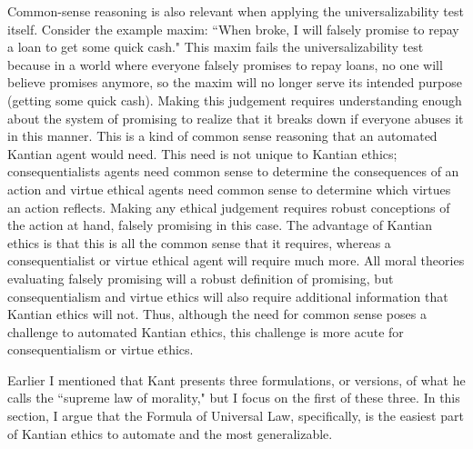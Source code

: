 \begin{isabellebody}
\begin{isamarkuptext}
Common-sense reasoning is also relevant when applying the universalizability test itself. Consider the example
maxim: ``When broke, I will falsely promise to repay a loan
to get some quick cash." This maxim fails the universalizability test because in a world where everyone
falsely promises to repay loans, no one will believe promises anymore, so the maxim will no longer serve
its intended purpose (getting some quick cash). Making this judgement requires understanding enough about
the system of promising to realize that it breaks down if everyone abuses it in this manner. This is a
kind of common sense reasoning that an automated Kantian agent would need. This need is not unique to
Kantian ethics; consequentialists agents need common sense to determine the consequences of 
an action and virtue ethical agents need common sense to determine which virtues an action
reflects. Making any ethical judgement requires robust conceptions of the action
at hand, falsely promising in this case. The advantage of Kantian ethics is that this is all the common 
sense that it requires, whereas a consequentialist or virtue ethical agent will require much more. All
moral theories evaluating falsely promising will a robust definition of promising, 
but consequentialism and virtue ethics will also require additional information
that Kantian ethics will not. Thus, although the need for common sense poses a challenge to automated
Kantian ethics, this challenge is more acute for consequentialism or virtue ethics.%
\end{isamarkuptext}\isamarkuptrue%
%
\isadelimdocument
%
\endisadelimdocument
%
\isatagdocument
%
\isamarkuptrue%
%
\endisatagdocument
{\isafolddocument}%
%
\isadelimdocument
%
\endisadelimdocument
%
\begin{isamarkuptext}%
Earlier I mentioned that Kant presents three formulations, or versions, 
of what he calls the ``supreme law of morality," but I focus on the first of these three. In this section, 
I argue that the Formula of Universal Law, specifically, is the easiest part of Kantian ethics to automate
and the most generalizable.


\end{isamarkuptext}
\end{isabellebody}
